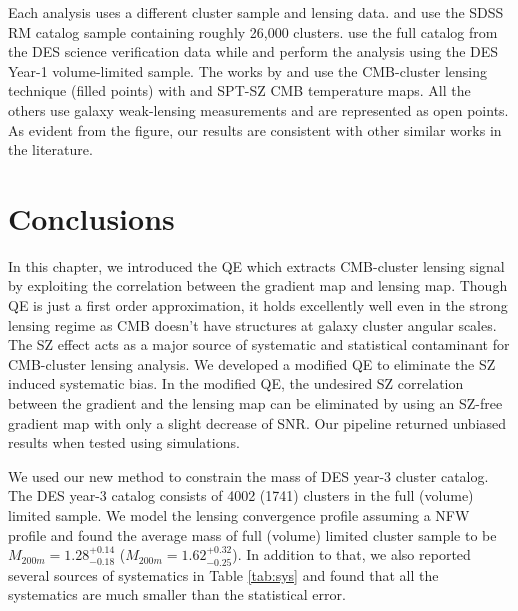 {%
Each analysis uses a different cluster sample and lensing data.
\citet{simet18} and \citet{geach17} use the SDSS RM catalog sample containing roughly 26,000 clusters. %
\citet{melchoir17} use the full catalog from the DES science verification data while \cite{baxter18} and \cite{mcclintock18} perform the analysis using the DES Year-1 volume-limited sample.
The works by \citet{geach17} and \cite{baxter18} use the CMB-cluster lensing technique (filled points) with \planck{} and {\sc SPT-SZ} CMB temperature maps.
All the others use galaxy weak-lensing measurements and are represented as open points. As evident from the figure, our results are consistent with other similar works in the literature.
}\fi
\section{Conclusions}
\label{sec_con}

In this chapter, we introduced the QE which extracts CMB-cluster lensing signal by exploiting the correlation between the gradient map and lensing map. 
Though QE is just a first order approximation, it holds excellently well even in the strong lensing regime as CMB doesn't have structures at galaxy cluster angular scales. 
The SZ effect acts as a major source of systematic and statistical contaminant for CMB-cluster lensing analysis.
We developed a modified QE to eliminate the SZ induced systematic bias. 
In the modified QE, the undesired SZ correlation between the gradient and the lensing map can be eliminated by using an SZ-free gradient map with only a slight decrease of SNR. 
Our pipeline returned unbiased results when tested using simulations. 
 
We used our new method to constrain the mass of DES year-3 cluster catalog.
The DES year-3 catalog consists of 4002 (1741) clusters in the full (volume) limited sample. 
We model the lensing convergence profile assuming a NFW profile and found the average mass of full (volume) limited cluster sample to be $M_{200m} = 1.28^{+0.14}_{-0.18}$ ($M_{200m} = 1.62^{+0.32}_{-0.25}$). 
In addition to that, we also reported several sources of systematics in Table \ref{tab:sys} and found that all the systematics are much smaller than the statistical error.%



  
 

